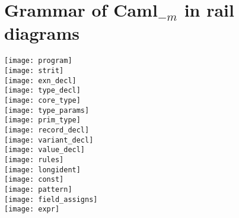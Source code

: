 \section{Grammar of Caml$_{-m}$ in rail diagrams}
\label{sec:grammar}
\texttt{[image: program]} \\[0.2em]
\texttt{[image: strit]} \\[0.2em]
\texttt{[image: exn\_decl]} \\[0.2em]
\texttt{[image: type\_decl]} \\[0.2em]
\texttt{[image: core\_type]} \\[0.2em]
\texttt{[image: type\_params]} \\[0.2em]
\texttt{[image: prim\_type]} \\[0.2em]
\texttt{[image: record\_decl]} \\[0.2em]
\texttt{[image: variant\_decl]} \\[0.2em]
\texttt{[image: value\_decl]} \\[0.2em]
\texttt{[image: rules]} \\[0.2em]
\texttt{[image: longident]} \\[0.2em]
\texttt{[image: const]} \\[0.2em]
\texttt{[image: pattern]} \\[0.2em]
\texttt{[image: field\_assigns]} \\[0.2em]
\texttt{[image: expr]} 

